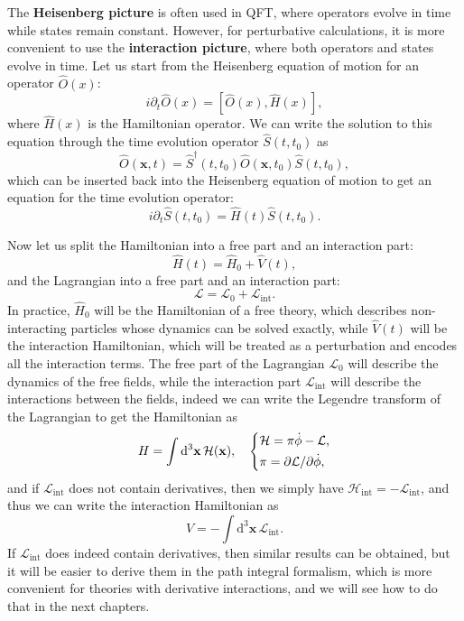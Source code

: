 The \textbf{Heisenberg picture} is often used in QFT, where operators evolve in time while states remain constant. However, for perturbative calculations, it is more convenient to use the \textbf{interaction picture}, where both operators and states evolve in time. Let us start from the Heisenberg equation of motion for an operator \( \hat{O}(x) \):
\[
    i \partial_t \hat{O}(x) = [\hat{O}(x), \hat{H}(x)],
\]
where \(\hat{H}(x)\) is the Hamiltonian operator. We can write the solution to this equation through the time evolution operator \(\hat{S}(t, t_0)\) as
\[
    \hat{O}(\mathbf{x}, t) = \hat{S}^{\dagger}(t, t_0) \hat{O}(\mathbf{x}, t_0) \hat{S}(t, t_0),
\]
which can be inserted back into the Heisenberg equation of motion to get an equation for the time evolution operator:
\[
    i \partial_t \hat{S}(t, t_0) = \hat{H}(t) \hat{S}(t, t_0).
\]

Now let us split the Hamiltonian into a free part and an interaction part:
\[
    \hat{H}(t) = \hat{H}_0 + \hat{V}(t),
\]
and the Lagrangian into a free part and an interaction part:
\[
    \mathcal{L} = \mathcal{L}_0 + \mathcal{L}_{\text{int}}.
\]
In practice, \(\hat{H}_0\) will be the Hamiltonian of a free theory, which describes non-interacting particles whose dynamics can be solved exactly, while \(\hat{V}(t)\) will be the interaction Hamiltonian, which will be treated as a perturbation and encodes all the interaction terms. The free part of the Lagrangian \(\mathcal{L}_0\) will describe the dynamics of the free fields, while the interaction part \(\mathcal{L}_{\text{int}}\) will describe the interactions between the fields, indeed we can write the Legendre transform of the Lagrangian to get the Hamiltonian as
\[
    H = \int \mathrm{d}^3 \mathbf{x} \, \mathcal{H} (\mathbf{x}), \quad \begin{dcases}
        \mathcal{H} = \pi \dot{\phi} - \mathcal{L}, \\
        \pi = \partial \mathcal{L} / \partial \dot{\phi},
    \end{dcases}
\]
and if \(\mathcal{L}_{\text{int}} \) does not contain derivatives, then we simply have \(\mathcal{H}_{\text{int}} = - \mathcal{L}_{\text{int}} \), and thus we can write the interaction Hamiltonian as
\[
    V = - \int \mathrm{d}^3 \mathbf{x} \, \mathcal{L}_{\text{int}}.
\]
If \(\mathcal{L}_{\text{int}} \) does indeed contain derivatives, then similar results can be obtained, but it will be easier to derive them in the path integral formalism, which is more convenient for theories with derivative interactions, and we will see how to do that in the next chapters.

